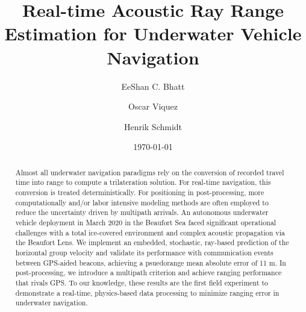 \title[JASA/draft]{Real-time Acoustic Ray Range Estimation for Underwater Vehicle Navigation}
\author{EeShan C. Bhatt}
\author{Oscar Viquez}
\author{Henrik Schmidt}



\date{\today}

\begin{abstract}
Almost all underwater navigation paradigms rely on the conversion of recorded travel time into range to compute a trilateration solution.
For real-time navigation, this conversion is treated deterministically.
For positioning in post-processing, more computationally and/or labor intensive modeling methods are often employed to reduce the uncertainty driven by multipath arrivals.
An autonomous underwater vehicle deployment in March 2020 in the Beaufort Sea faced significant operational challenges with a total ice-covered environment and complex acoustic propagation via the Beaufort Lens.
We implement an embedded, stochastic, ray-based prediction of the horizontal group velocity and validate its performance with communication events between GPS-aided beacons, achieving a psuedorange mean absolute error of 11 m.
In post-processing, we introduce a multipath criterion and achieve ranging performance that rivals GPS.
To our knowledge, these results are the first field experiment to demonstrate a real-time, physics-based data processing to minimize ranging error in underwater navigation.
\end{abstract}


\maketitle


